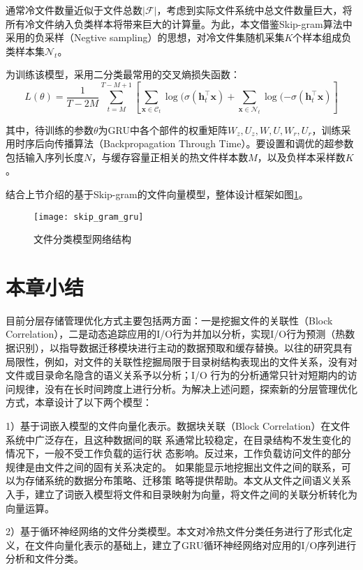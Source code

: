 通常冷文件数量近似于文件总数$|\mathcal{F}|$，考虑到实际文件系统中总文件数量巨大，将所有冷文件纳入负类样本将带来巨大的计算量。为此，本文借鉴Skip-gram算法中采用的负采样（Negtive sampling）的思想，对冷文件集随机采集$K$个样本组成负类样本集$\mathcal{N}_t$。

为训练该模型，采用二分类最常用的交叉熵损失函数：
\begin{equation}
    L(\theta) = \frac{1}{T-2M}\sum_{t=M}^{T-M+1} \left[
        \sum_{\mathbf{x} \in \mathcal{C}_t} \log(\sigma(\mathbf{h}_t^{\top} \mathbf{x}) + 
        \sum_{\mathbf{x} \in \mathcal{N}_t} \log(-\sigma(\mathbf{h}_t^{\top} \mathbf{x})
    \right]
\end{equation}

其中，待训练的参数$\theta$为GRU中各个部件的权重矩阵$W_z, U_z, W, U, W_r, U_r$，训练采用时序后向传播算法（Backpropagation Through Time）。要设置和调优的超参数包括输入序列长度$N$，与缓存容量正相关的热文件样本数$M$，以及负样本采样数$K$。

结合上节介绍的基于Skip-gram的文件向量模型，整体设计框架如图\ref{fig:skip_gram_gru}。

\begin{figure}[htp]
\centering
\texttt{[image: skip\_gram\_gru]}
\caption{文件分类模型网络结构}
\label{fig:skip_gram_gru}
\end{figure}


\section{本章小结}
目前分层存储管理优化方式主要包括两方面：一是挖掘文件的关联性（Block Correlation），二是动态追踪应用的I/O行为并加以分析，实现I/O行为预测（热数据识别），以指导数据迁移模块进行主动的数据预取和缓存替换。以往的研究具有局限性，例如，对文件的关联性挖掘局限于目录树结构表现出的文件关系，没有对文件或目录命名隐含的语义关系予以分析；I/O 行为的分析通常只针对短期内的访问规律，没有在长时间跨度上进行分析。为解决上述问题，探索新的分层管理优化方式，本章设计了以下两个模型：

1）基于词嵌入模型的文件向量化表示。数据块关联（Block Correlation）在文件系统中广泛存在，且这种数据间的联 系通常比较稳定，在目录结构不发生变化的情况下，一般不受工作负载的运行状 态影响。反过来，工作负载访问文件的部分规律是由文件之间的固有关系决定的。 如果能显示地挖掘出文件之间的联系，可以为存储系统的数据分布策略、迁移策 略等提供帮助。本文从文件之间语义关系入手，建立了词嵌入模型将文件和目录映射为向量，将文件之间的关联分析转化为向量运算。

2）基于循环神经网络的文件分类模型。本文对冷热文件分类任务进行了形式化定义，在文件向量化表示的基础上，建立了GRU循环神经网络对应用的I/O序列进行分析和文件分类。



